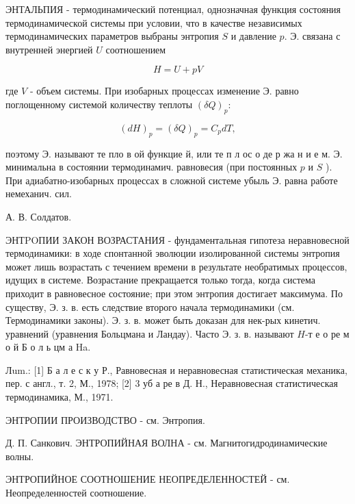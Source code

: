 \documentclass[10pt]{article}
\begin{document}
ЭНТАЛЬПИЯ - термодинамический потенциал, однозначная функция состояния термодинамической системы при условии, что в качестве независимых термодинамических параметров выбраны энтропия $S$ и давление $p$. Э. связана с внутренней энергией $U$ соотношением



\[

H=U+p V

\]



где $V$ - объем системы. При изобарных процессах изменение Э. равно поглощенному системой количеству теплоты $(\delta Q)_{p}:$



\[

(d H)_{p}=(\delta Q)_{p}=C_{p} d T,

\]



поэтому Э. называют те пло в ой функцие й, или те п л ос о де р жа н и е м. Э. минимальна в состоянии термодинамич. равновесия (при постоянных $p$ и $S$ ). При адиабатно-изобарных процессах в сложной системе убыль Э. равна работе немеханич. сил.



А. В. Солдатов.



ЭНТPOПИИ ЗАКОН ВОЗРАСТАНИЯ - фундаментальная гипотеза неравновесной термодинамики: в ходе спонтанной эволюции изолированной системы энтропия может лишь возрастать с течением времени в результате необратимых процессов, идущих в системе. Возрастание прекращается только тогда, когда система приходит в равновесное состояние; при этом энтропия достигает максимума. По существу, Э. з. в. есть следствие второго начала термодинамики (см. Термодинамики законы). Э. з. в. может быть доказан для нек-рых кинетич. уравнений (уравнения Больцмана и Ландау). Часто Э. з. в. называют $H$-т е о ре м о й Б о л ь цм а Ha.



Лum.: [1] Б а л е с к у Р., Равновесная и неравновесная статистическая механика, пер. с англ., т. 2, М., 1978; [2] 3 уб а ре в Д. Н., Неравновесная статистическая термодинамика, М., 1971.



ЭНТРОПИИ ПРОИЗВОДСТВО - см. Энтропия.



Д. П. Санкович. ЭНТРОПИЙНАЯ ВОЛНА - см. Магнитогидродинамические волны.



ЭНТРОПИЙНОЕ СООТНОШЕНИЕ НЕОПРЕДЕЛЕННОСТЕЙ - см. Неопределенностей соотношение.
\end{document}
